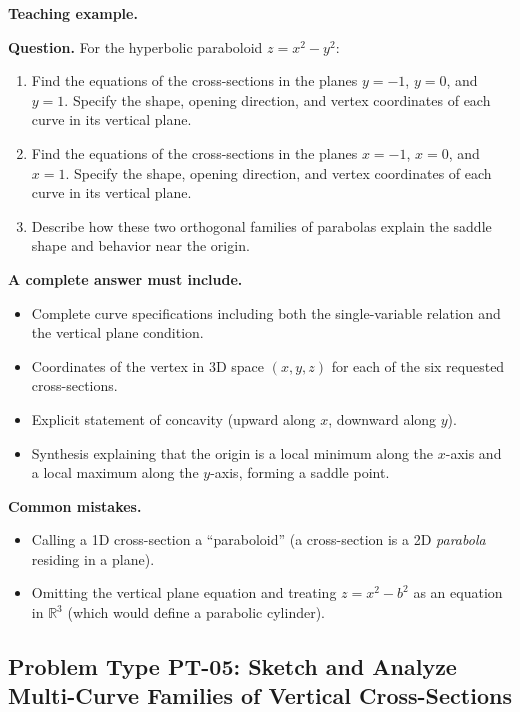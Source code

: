 \documentclass[11pt,letterpaper]{article}
\newcommand{\R}{\mathbb{R}}
\begin{document}
\textbf{Teaching example.}

\textbf{Question.} 
For the hyperbolic paraboloid $z = x^2 - y^2$:
\begin{enumerate}[label=(\alph*),nosep]
    \item Find the equations of the cross-sections in the planes $y = -1$, $y = 0$, and $y = 1$. Specify the shape, opening direction, and vertex coordinates of each curve in its vertical plane.
    \item Find the equations of the cross-sections in the planes $x = -1$, $x = 0$, and $x = 1$. Specify the shape, opening direction, and vertex coordinates of each curve in its vertical plane.
    \item Describe how these two orthogonal families of parabolas explain the saddle shape and behavior near the origin.
\end{enumerate}

\textbf{A complete answer must include.}
\begin{itemize}[leftmargin=*,nosep]
    \item Complete curve specifications including both the single-variable relation and the vertical plane condition.
    \item Coordinates of the vertex in 3D space $(x,y,z)$ for each of the six requested cross-sections.
    \item Explicit statement of concavity (upward along $x$, downward along $y$).
    \item Synthesis explaining that the origin is a local minimum along the $x$-axis and a local maximum along the $y$-axis, forming a saddle point.
\end{itemize}

\textbf{Common mistakes.}
\begin{itemize}[leftmargin=*,nosep]
    \item Calling a 1D cross-section a ``paraboloid'' (a cross-section is a 2D \emph{parabola} residing in a plane).
    \item Omitting the vertical plane equation and treating $z = x^2 - b^2$ as an equation in $\R^3$ (which would define a parabolic cylinder).
\end{itemize}

\subsection{Problem Type PT-05: Sketch and Analyze Multi-Curve Families of Vertical Cross-Sections}\label{pt:05}
\end{document}
